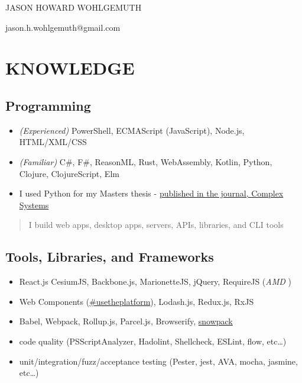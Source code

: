 \documentclass[10pt]{article}
\def\tightlist{}
\begin{document}
\begin{center}\Huge {JASON HOWARD WOHLGEMUTH}\end{center}
\begin{center}jason.h.wohlgemuth@gmail.com\end{center}

\hypertarget{knowledge}{%
\section{KNOWLEDGE}\label{knowledge}}

\hypertarget{programming}{%
\subsection{Programming}\label{programming}}

\begin{itemize}
\tightlist
\item
  \emph{(Experienced)} PowerShell, ECMAScript (JavaScript), Node.js,
  HTML/XML/CSS
\item
  \emph{(Familiar)} C\#, F\#, ReasonML, Rust, WebAssembly, Kotlin,
  Python, Clojure, ClojureScript, Elm
\item
  I used Python for my Masters thesis -
  \href{https://www.complex-systems.com/abstracts/v23_i03_a01/}{published
  in the journal, Complex Systems}
\end{itemize}

\begin{quote}
I build web apps, desktop apps, servers, APIs, libraries, and CLI tools
\end{quote}

\hypertarget{tools-libraries-and-frameworks}{%
\subsection{Tools, Libraries, and
Frameworks}\label{tools-libraries-and-frameworks}}

\begin{itemize}
\tightlist
\item
  React.js CesiumJS, Backbone.js, MarionetteJS, jQuery, RequireJS
  (\emph{AMD })
\item
  Web Components
  (\href{https://twitter.com/hashtag/usetheplatform?src=hash}{\#usetheplatform}),
  Lodash.js, Redux.js, RxJS
\item
  Babel, Webpack, Rollup.js, Parcel.js, Browserify,
  \href{https://www.pika.dev/blog/pika-web-a-future-without-webpack/}{snowpack}
\item
  code quality (PSScriptAnalyzer, Hadolint, Shellcheck, ESLint, flow,
  etc\ldots{})
\item
  unit/integration/fuzz/acceptance testing (Pester, jest, AVA, mocha,
  jasmine, etc\ldots{})
\end{itemize}
\end{document}
